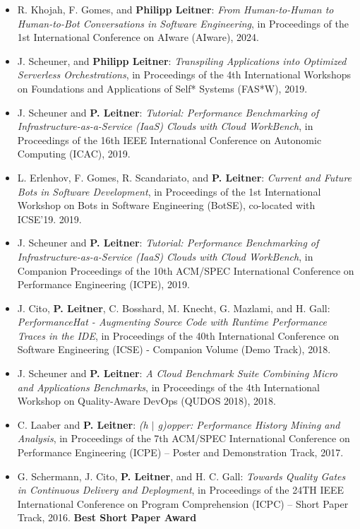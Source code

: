 \documentclass[paper=letter,fontsize=11pt]{scrartcl} %
\begin{document}
\begin{itemize}
	\item R. Khojah, F. Gomes, and \textbf{Philipp Leitner}:
\emph{From Human-to-Human to Human-to-Bot Conversations in Software
Engineering}, in Proceedings of the 1st International Conference on AIware (AIware), 2024.  
	\item J. Scheuner, and \textbf{Philipp Leitner}:
\emph{Transpiling Applications into Optimized Serverless Orchestrations}, in Proceedings of the 4th International Workshops on Foundations and Applications of Self* Systems (FAS*W), 2019.
	\item J. Scheuner and \textbf{P. Leitner}: \emph{Tutorial: Performance Benchmarking of Infrastructure-as-a-Service (IaaS) Clouds with Cloud WorkBench}, in Proceedings of the 16th IEEE International Conference on Autonomic Computing (ICAC), 2019.
	\item L. Erlenhov, F. Gomes, R. Scandariato, and \textbf{P. Leitner}: \emph{Current and Future Bots in Software Development}, in Proceedings of the 1st International Workshop on
Bots in Software Engineering (BotSE), co-located with ICSE'19. 2019.
	\item J. Scheuner and \textbf{P. Leitner}: \emph{Tutorial: Performance Benchmarking of Infrastructure-as-a-Service (IaaS) Clouds with Cloud WorkBench}, in Companion Proceedings of the 10th ACM/SPEC International Conference on Performance Engineering (ICPE), 2019.
	\item J. Cito, \textbf{P. Leitner}, C. Bosshard, M. Knecht, G. Mazlami, and H. Gall: \emph{PerformanceHat - Augmenting Source Code with Runtime Performance Traces in the IDE}, in Proceedings of the 40th International Conference on Software Engineering (ICSE) - Companion Volume (Demo Track), 2018.
	\item J. Scheuner and \textbf{P. Leitner}: \emph{A Cloud Benchmark Suite Combining Micro and Applications Benchmarks}, in Proceedings of the 4th International Workshop on Quality-Aware DevOps (QUDOS 2018), 2018.
	\item C. Laaber and \textbf{P. Leitner}: \emph{ (h $|$ g)opper: Performance History Mining and Analysis},  in Proceedings of the 7th ACM/SPEC International Conference on Performance Engineering (ICPE) -- Poster and Demonstration Track, 2017.
	\item G. Schermann, J. Cito, \textbf{P. Leitner}, and H. C. Gall: \emph{Towards Quality Gates in Continuous Delivery and Deployment}, in Proceedings of the 24TH IEEE International Conference on Program Comprehension (ICPC) – Short Paper Track, 2016. \textbf{Best Short Paper Award}

\end{itemize}
\end{document}
